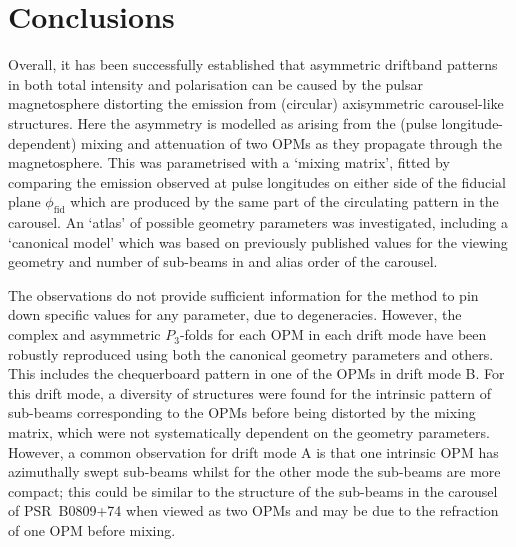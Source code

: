 







\section{Conclusions}
\label{sec: B0031 - conclusion}


Overall, it has been successfully established that asymmetric driftband patterns in both total intensity and polarisation can be caused by the pulsar magnetosphere distorting the emission from (circular) axisymmetric carousel-like structures. Here the asymmetry is modelled as arising from the (pulse longitude-dependent) mixing and attenuation of two OPMs as they propagate through the magnetosphere. This was parametrised with a `mixing matrix', fitted by comparing the emission observed at pulse longitudes on either side of the fiducial plane $\phi_\mathrm{fid}$ which are produced by the same part of the circulating pattern in the carousel. An `atlas' of possible geometry parameters was investigated, including a `canonical model' which was based on previously published values for the viewing geometry and number of sub-beams in and alias order of the carousel. 

The observations do not provide sufficient information for the method to pin down specific values for any parameter, due to degeneracies. However, the complex and asymmetric $P_3$-folds for each OPM in each drift mode have been robustly reproduced using both the canonical geometry parameters and others. This includes the chequerboard pattern in one of the OPMs in drift mode B. For this drift mode, a diversity of structures were found for the intrinsic pattern of sub-beams corresponding to the OPMs before being distorted by the mixing matrix, which were not systematically dependent on the geometry parameters. However, a common observation for drift mode A is that one intrinsic OPM has azimuthally swept sub-beams whilst for the other mode the sub-beams are more compact; this could be similar to the structure of the sub-beams in the carousel of PSR~B0809+74 when viewed as two OPMs \citep{RRL+2006} and may be due to the refraction of one OPM \citep[The O-mode;][]{ABxx1986} before mixing.

